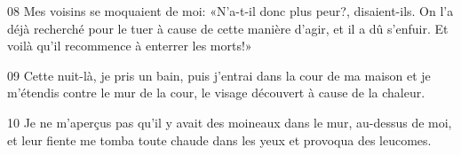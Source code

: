 
08 Mes voisins se moquaient de moi: «N’a-t-il donc plus peur?, disaient-ils. On l’a déjà recherché pour le tuer à cause de cette manière d’agir, et il a dû s’enfuir. Et voilà qu’il recommence à enterrer les morts!»

09 Cette nuit-là, je pris un bain, puis j’entrai dans la cour de ma maison et je m’étendis contre le mur de la cour, le visage découvert à cause de la chaleur.

10 Je ne m’aperçus pas qu’il y avait des moineaux dans le mur, au-dessus de moi, et leur fiente me tomba toute chaude dans les yeux et provoqua des leucomes.